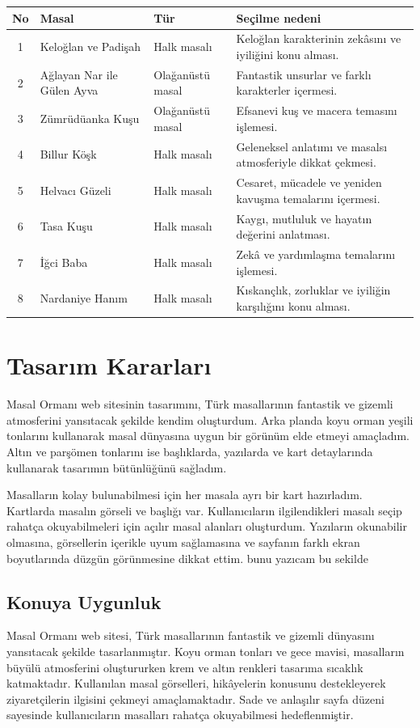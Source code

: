 \documentclass[12pt,a4paper]{article}
\begin{document}
\begin{longtable}{@{}cp{4cm}p{3cm}p{5.4cm}@{}}
\toprule
\textbf{No} & \textbf{Masal} & \textbf{Tür} & \textbf{Seçilme nedeni} \\
\midrule
\endhead
1 & Keloğlan ve Padişah & Halk masalı & Keloğlan karakterinin zekâsını ve iyiliğini konu alması. \\
2 & Ağlayan Nar ile Gülen Ayva & Olağanüstü masal & Fantastik unsurlar ve farklı karakterler içermesi. \\
3 & Zümrüdüanka Kuşu & Olağanüstü masal & Efsanevi kuş ve macera temasını işlemesi. \\
4 & Billur Köşk & Halk masalı & Geleneksel anlatımı ve masalsı atmosferiyle dikkat çekmesi. \\
5 & Helvacı Güzeli & Halk masalı & Cesaret, mücadele ve yeniden kavuşma temalarını içermesi. \\
6 & Tasa Kuşu & Halk masalı & Kaygı, mutluluk ve hayatın değerini anlatması. \\
7 & İğci Baba & Halk masalı & Zekâ ve yardımlaşma temalarını işlemesi. \\
8 & Nardaniye Hanım & Halk masalı & Kıskançlık, zorluklar ve iyiliğin karşılığını konu alması. \\
\bottomrule
\end{longtable}

\section{Tasarım Kararları}
Masal Ormanı web sitesinin tasarımını, Türk masallarının fantastik ve gizemli atmosferini yansıtacak şekilde kendim oluşturdum. Arka planda koyu orman yeşili tonlarını kullanarak masal dünyasına uygun bir görünüm elde etmeyi amaçladım. Altın ve parşömen tonlarını ise başlıklarda, yazılarda ve kart detaylarında kullanarak tasarımın bütünlüğünü sağladım.

Masalların kolay bulunabilmesi için her masala ayrı bir kart hazırladım. Kartlarda masalın görseli ve başlığı var. Kullanıcıların ilgilendikleri masalı seçip rahatça okuyabilmeleri için açılır masal alanları oluşturdum. Yazıların okunabilir olmasına, görsellerin içerikle uyum sağlamasına ve sayfanın farklı ekran boyutlarında düzgün görünmesine dikkat ettim. bunu yazıcam bu sekilde

\subsection{Konuya Uygunluk}
Masal Ormanı web sitesi, Türk masallarının fantastik ve gizemli dünyasını yansıtacak şekilde tasarlanmıştır. Koyu orman tonları ve gece mavisi, masalların büyülü atmosferini oluştururken krem ve altın renkleri tasarıma sıcaklık katmaktadır. Kullanılan masal görselleri, hikâyelerin konusunu destekleyerek ziyaretçilerin ilgisini çekmeyi amaçlamaktadır. Sade ve anlaşılır sayfa düzeni sayesinde kullanıcıların masalları rahatça okuyabilmesi hedeflenmiştir.
\end{document}
